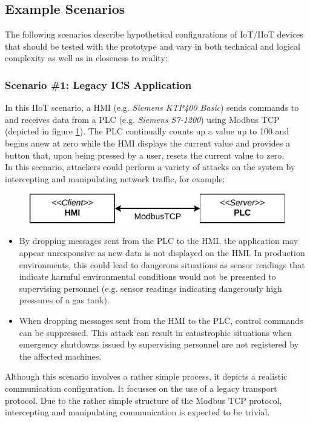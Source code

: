 \subsection{Example Scenarios}
\label{sec:example-scenarios}
The following scenarios describe hypothetical configurations of \ac{IoT}/\ac{IIoT} devices that should be tested with the prototype and vary in both technical and logical complexity as well as in closeness to reality:

\subsubsection{Scenario \#1: Legacy \ac{ICS} Application}
\label{par:scenario-1}
In this \ac{IIoT} scenario, a \ac{HMI} (e.g. \emph{Siemens KTP400 Basic}) sends commands to and receives data from a \ac{PLC} (e.g. \emph{Siemens S7-1200}) using Modbus \ac{TCP} (depicted in figure \ref{fig:arch-ics}). The \ac{PLC} continually counts up a value up to 100 and begins anew at zero while the \ac{HMI} displays the current value and provides a button that, upon being pressed by a user, resets the current value to zero. \\
In this scenario, attackers could perform a variety of attacks on the system by intercepting and manipulating network traffic, for example:
\begin{figure}[h]
    \centering
    \includegraphics{img/ch04/Scenario_ICS.pdf}
    \label{fig:arch-ics}
\end{figure}
\begin{itemize}
    \item By dropping messages sent from the \ac{PLC} to the \ac{HMI}, the application may appear unresponsive as new data is not displayed on the \ac{HMI}. In production environments, this could lead to dangerous situations as sensor readings that indicate harmful environmental conditions would not be presented to supervising personnel (e.g. sensor readings indicating dangerously high pressures of a gas tank).
    \item When dropping messages sent from the \ac{HMI} to the \ac{PLC}, control commands can be suppressed. This attack can result in catastrophic situations when emergency shutdowns issued by supervising personnel are not registered by the affected machines.
\end{itemize}
Although this scenario involves a rather simple process, it depicts a realistic communication configuration. It focusses on the use of a legacy transport protocol. Due to the rather simple structure of the Modbus \ac{TCP} protocol, intercepting and manipulating communication is expected to be trivial. %

